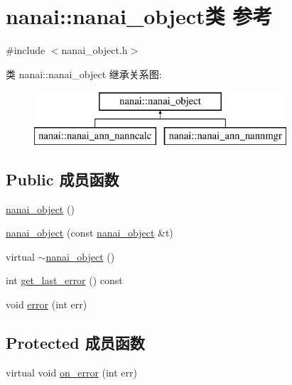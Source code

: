 \hypertarget{classnanai_1_1nanai__object}{}\section{nanai\+:\+:nanai\+\_\+object类 参考}
\label{classnanai_1_1nanai__object}


{\ttfamily \#include $<$nanai\+\_\+object.\+h$>$}

类 nanai\+:\+:nanai\+\_\+object 继承关系图\+:\begin{figure}[H]
\begin{center}
\leavevmode
\includegraphics[height=2.000000cm]{classnanai_1_1nanai__object}
\end{center}
\end{figure}
\subsection*{Public 成员函数}
\begin{DoxyCompactItemize}
\item 
\hyperlink{classnanai_1_1nanai__object_a066d094b5abc020f08b38ee92220da6a}{nanai\+\_\+object} ()
\item 
\hyperlink{classnanai_1_1nanai__object_a2c2b99938e659b07204690ab51b148c7}{nanai\+\_\+object} (const \hyperlink{classnanai_1_1nanai__object}{nanai\+\_\+object} \&t)
\item 
virtual \hyperlink{classnanai_1_1nanai__object_a7aaa650c4408749ac7e0ca70547920ee}{$\sim$nanai\+\_\+object} ()
\item 
int \hyperlink{classnanai_1_1nanai__object_ab70ce957f8be26e1a4c61461de9c4aa7}{get\+\_\+last\+\_\+error} () const 
\item 
void \hyperlink{classnanai_1_1nanai__object_a9b05c72f0058867e692dcbba020436c6}{error} (int err)
\end{DoxyCompactItemize}
\subsection*{Protected 成员函数}
\begin{DoxyCompactItemize}
\item 
virtual void \hyperlink{classnanai_1_1nanai__object_a87f162335cead23a1409f7c0570a3284}{on\+\_\+error} (int err)
\end{DoxyCompactItemize}
